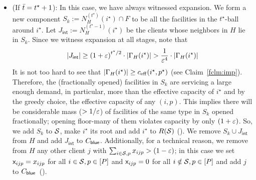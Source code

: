 \begin{itemize}
\item (If $\bar{t} =  t^\star + 1$):  In this case, we have always witnessed expansion. We form a new component  $S_k := N^{(t^\star)}_H(i^\star)\cap F$ to be all the facilities in the $t^\star$-ball around $i^\star$.
Let $J_\mathsf{int} := N^{(t^\star-1)}_H(i^\star)$ be the clients whose neighbors in $H$ lie in $S_k$. Since we witness expansion at all stages, note that
\begin{eqnarray}
\label{feq:jint}
 |J_\mathsf{int}| \geq \left(1+\varepsilon\right)^{t^\star/2}\cdot |\Gamma_H(i^\star)| > \frac{1}{\varepsilon^4}\cdot |\Gamma_H(i^\star)|
\end{eqnarray}
It is not too hard to see that $|\Gamma_H(i^\star)| \ge c_{\mathrm{eff}}(i^\star,p^\star)$ (see Claim~\ref{fclm:imp}).
Therefore, the  (fractionally opened) facilities in $S_k$ are servicing a large enough demand, in particular, more than the effective capacity of $i^\star$ and by the greedy choice, the effective capacity of any $(i,p)$.
This implies there will be considerable mass ($>1/\varepsilon$)  of facilities of the same type in $S_k$ opened fractionally; opening floor-many of them violates capacity by only $(1+\varepsilon)$.
So, we add $S_k$ to ${\cal S}$, make $i^\star$ its root and add $i^\star$ to $R({\cal S})$  (). We remove $S_k \cup J_\mathsf{int}$ from $H$ and add $J_\mathsf{int}$ to $C_{\mathsf{blue}}$. Additionally, for a technical reason, we remove from $H$ any other client $j$
with $\sum_{i\in {\cal S}, p} x_{ijp} > (1-\varepsilon)$; in this case we set ${\mathsf x}_{ijp} = x_{ijp}$ for all $i\in {\cal S}, p\in [P]$ and ${\mathsf x}_{ijp} = 0$ for all $i\notin {\cal S}, p\in [P]$ and add $j$ to $C_{\mathsf{blue}}$~().
%
%

\end{itemize}
